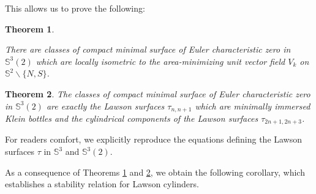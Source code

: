 \documentclass[reqno,11pt]{amsart}
\newtheorem{theorem}{Theorem}
\begin{document}
This allows us to prove the following:

\begin{theorem}\label{Thm:Main1}

There are classes of compact minimal surface of Euler characteristic zero in $\mathbb{S}^3(2)$ which are locally isometric to the area-minimizing unit vector field $V_k$ on $\mathbb{S}^2\backslash\{N,S\}$.%
\end{theorem}

\begin{theorem} \label{Thm:Main2}
    The classes of compact minimal surface of Euler characteristic zero in $\mathbb{S}^3(2)$ are exactly the Lawson surfaces $\tau_{n,n+1}$ which are minimally immersed Klein bottles and the cylindrical components of the Lawson surfaces $\tau_{2n+1,2n+3}$. %
\end{theorem}    


For readers comfort, we explicitly reproduce the equations defining the Lawson surfaces $\tau$ in $\mathbb{S}^3$ and $\mathbb{S}^3(2)$.



As a consequence of Theorems \ref{Thm:Main1} and \ref{Thm:Main2}, we obtain the following corollary, which establishes a stability relation for Lawson cylinders.

\end{document}
